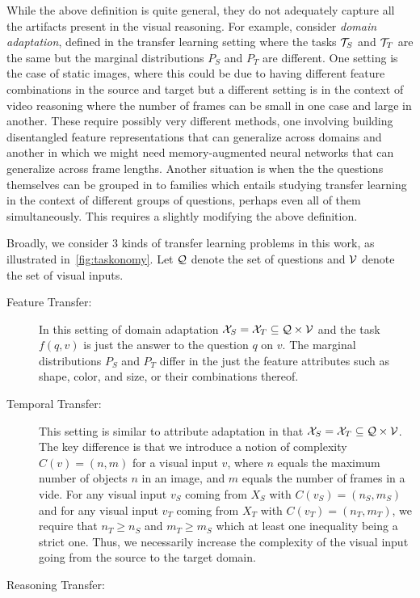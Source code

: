 While the above definition is quite general, they do not adequately capture all the artifacts present in the visual reasoning.
For example, consider \emph{domain adaptation}, defined  in the transfer learning setting where the tasks $\mathcal{T}_S$ and $\mathcal{T}_T$ are the same 
but the marginal distributions $P_S$ and $P_T$ are different.
One setting is the case of static images, where this could be due to having different feature combinations in the source and
target but a different setting is in the context of video reasoning where the number of frames can be small in one case and 
large in another.
These require possibly very different methods, one involving building disentangled feature representations that can generalize across 
domains and another in which we might need memory-augmented neural networks that can generalize across frame lengths.
Another situation is when the  the questions themselves can be grouped in to families which entails studying transfer learning
in the context of different groups of questions, perhaps even all of them simultaneously.
This requires a slightly modifying the above definition.

Broadly, we consider 3 kinds of transfer learning problems in this work, as illustrated in~\cref{fig:taskonomy}. 
Let $\mathcal{Q}$ denote the set of questions and $\mathcal{V}$ denote the set of visual inputs.
\begin{description}
	\item[Feature Transfer:] In this setting of domain adaptation $\mathcal{X}_S = \mathcal{X}_T \subseteq \mathcal{Q} \times \mathcal{V}$
	and the task $f(q,v)$ is just the answer to the question $q$ on $v$.
	The marginal distributions $P_S$ and $P_T$ differ in the just the feature attributes such as shape, color, and size, or their combinations
	thereof.
	\item[Temporal Transfer:] This setting is similar to attribute adaptation in that $\mathcal{X}_S = \mathcal{X}_T \subseteq \mathcal{Q} \times \mathcal{V}$.
	The key difference is that we introduce a notion of complexity $C(v) = (n, m)$ for a visual input $v$,
	where $n$ equals the maximum number of objects $n$ in an image, and $m$
	equals  the number of frames in a vide. 
	For any visual input $v_S$ coming from $X_S$ with $C(v_S) = (n_S, m_S)$
	and for any visual input $v_T$ coming from $X_T$ with $C(v_T) = (n_T, m_T)$, we require that $n_T \ge n_S$ and 
	$m_T \ge m_S$ which at least one inequality being a strict one. 
	Thus, we necessarily increase the complexity of the visual input going from the source to the target domain.
	\item[Reasoning Transfer:]
\end{description}


